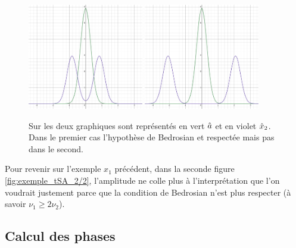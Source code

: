 \begin{annexe}
\begin{figure}[h]\centering
	\includegraphics[width=0.45\textwidth]{fig/part-1/bedro condi 1.png} 
	\hfill
	\includegraphics[width=0.45\textwidth]{fig/part-1/bedro condi 2.png} 
	\caption{Sur les deux graphiques sont représentés en vert $\hat{a}$ et en violet $\hat{x}_2$. Dans le premier cas l'hypothèse de Bedrosian et respectée mais pas dans le second.}
	\label{fig:alising-ish}
\end{figure}


Pour revenir sur l'exemple $x_1$ précédent, dans la seconde figure \ref{fig:exemple_tSA_2/2}, l'amplitude ne colle plus à l'interprétation que l'on voudrait justement parce que la condition de Bedrosian n'est plus respecter (à savoir $\nu_1\geq 2\nu_2$). 




\subsection{Calcul des phases}\label{ann:demo_phases_2var}


\end{annexe}

